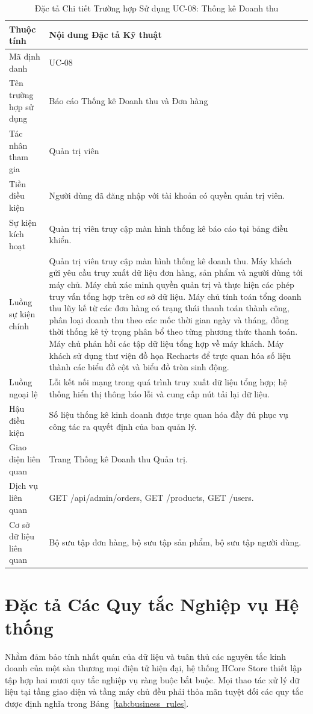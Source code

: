 \begin{table}[H]
\centering
\caption{Đặc tả Chi tiết Trường hợp Sử dụng UC-08: Thống kê Doanh thu}
\label{tab:uc08}
\begin{tabularx}{\textwidth}{p{3.5cm}X}
\toprule
\textbf{Thuộc tính} & \textbf{Nội dung Đặc tả Kỹ thuật} \\
\midrule
Mã định danh & UC-08 \\
Tên trường hợp sử dụng & Báo cáo Thống kê Doanh thu và Đơn hàng \\
Tác nhân tham gia & Quản trị viên \\
Tiền điều kiện & Người dùng đã đăng nhập với tài khoản có quyền quản trị viên. \\
Sự kiện kích hoạt & Quản trị viên truy cập màn hình thống kê báo cáo tại bảng điều khiển. \\
Luồng sự kiện chính & 
Quản trị viên truy cập màn hình thống kê doanh thu.
Máy khách gửi yêu cầu truy xuất dữ liệu đơn hàng, sản phẩm và người dùng tới máy chủ.
Máy chủ xác minh quyền quản trị và thực hiện các phép truy vấn tổng hợp trên cơ sở dữ liệu.
Máy chủ tính toán tổng doanh thu lũy kế từ các đơn hàng có trạng thái thanh toán thành công, phân loại doanh thu theo các mốc thời gian ngày và tháng, đồng thời thống kê tỷ trọng phân bổ theo từng phương thức thanh toán.
Máy chủ phản hồi các tập dữ liệu tổng hợp về máy khách.
Máy khách sử dụng thư viện đồ họa Recharts để trực quan hóa số liệu thành các biểu đồ cột và biểu đồ tròn sinh động. \\
Luồng ngoại lệ & Lỗi kết nối mạng trong quá trình truy xuất dữ liệu tổng hợp; hệ thống hiển thị thông báo lỗi và cung cấp nút tải lại dữ liệu. \\
Hậu điều kiện & Số liệu thống kê kinh doanh được trực quan hóa đầy đủ phục vụ công tác ra quyết định của ban quản lý. \\
Giao diện liên quan & Trang Thống kê Doanh thu Quản trị. \\
Dịch vụ liên quan & GET /api/admin/orders, GET /products, GET /users. \\
Cơ sở dữ liệu liên quan & Bộ sưu tập đơn hàng, bộ sưu tập sản phẩm, bộ sưu tập người dùng. \\
\bottomrule
\end{tabularx}
\end{table}

\section{Đặc tả Các Quy tắc Nghiệp vụ Hệ thống}
Nhằm đảm bảo tính nhất quán của dữ liệu và tuân thủ các nguyên tắc kinh doanh của một sàn thương mại điện tử hiện đại, hệ thống HCore Store thiết lập tập hợp hai mươi quy tắc nghiệp vụ ràng buộc bắt buộc. Mọi thao tác xử lý dữ liệu tại tầng giao diện và tầng máy chủ đều phải thỏa mãn tuyệt đối các quy tắc được định nghĩa trong Bảng~\ref{tab:business_rules}.

